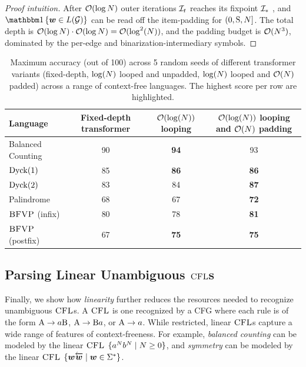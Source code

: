 \documentclass{article}
\begin{document}
\begin{proof}[Proof intuition]
    After ${{ \mathcal{O}}}(\log {{ N}})$ outer iterations ${{\mathcal{I}}}_t$ reaches its fixpoint ${{\mathcal{I}}}_*$ \citep{chytil-unambiguous}, and $\ind{\str \in \lang(\grammar)}$ can be read off the item-padding for $(0, {{ \mathrm{S}}}, {{ N}}]$.
    The total depth is ${{ \mathcal{O}}}(\log {{ N}}) \cdot {{ \mathcal{O}}}(\log {{ N}}) = {{ \mathcal{O}}}(\log^2({{ N}}))$, and the padding budget is ${{ \mathcal{O}}}({{ N}}^3)$, dominated by the per-edge and binarization-intermediary symbols.
\end{proof}

\begin{table}[t]
    \small
    \centering
    \begin{tabular}{lccc}
        \toprule
        Language & Fixed-depth transformer & ${{ \mathcal{O}}}(\log({{ N}}))$ looping & ${{ \mathcal{O}}}(\log({{ N}}))$ looping and ${{ \mathcal{O}}}({{ N}})$ padding \\
        \midrule
        Balanced Counting        & 90 & \textbf{94} & 93 \\
        $\dyck{1}$               & 85 & \textbf{86} & \textbf{86} \\
        $\dyck{2}$               & 83 & 84 & \textbf{87} \\
        Palindrome               & 68 & 67  & \textbf{72} \\
        ${\textsc{BFVP}}$ (infix)          & 80 & 78 & \textbf{81} \\
        ${\textsc{BFVP}}$ (postfix)        & 67 & \textbf{75} & \textbf{75} \\
        \bottomrule
    \end{tabular}
    \caption{
    Maximum accuracy (out of 100) across 5 random seeds of different transformer variants
    (fixed-depth, $\log({{ N}})$ looped and unpadded, $\log({{ N}})$ looped and
    ${{ \mathcal{O}}}({{ N}})$ padded) across a range of context-free languages.
    The highest score per row are highlighted.
    }
    \label{fig:resultsexp}
\end{table}

\subsection{Parsing Linear Unambiguous ${\textsc{CFL}}$s}\label{subsec:linearalgo}
Finally, we show how \emph{linearity} further reduces the resources needed to recognize unambiguous ${\textsc{CFL}}$s.
A  ${\textsc{CFL}}$ is one recognized by a CFG where each rule is of the form ${{ {{ \mathrm{A}}} \rightarrow {{a}} {{ \mathrm{B}}}}}$, ${{ {{ \mathrm{A}}} \rightarrow {{ \mathrm{B}}} {{a}}}}$, or ${{ {{ \mathrm{A}}} \rightarrow {{a}}}}$.
While restricted, linear ${\textsc{CFL}}$s capture a wide range of features of context-freeness.
For example, \emph{balanced counting} can be modeled by the linear ${\textsc{CFL}}$ $\{{{a}}^{{ N}} {{b}}^{{ N}} \mid {{ N}} \geq 0\}$, and \emph{symmetry} can be modeled by the linear ${\textsc{CFL}}$ $\{{{\boldsymbol{w}}} {\overleftarrow{{{\boldsymbol{w}}}}} \mid {{\boldsymbol{w}}} \in {{{{ \Sigma}}^*}}\}$.
\end{document}
